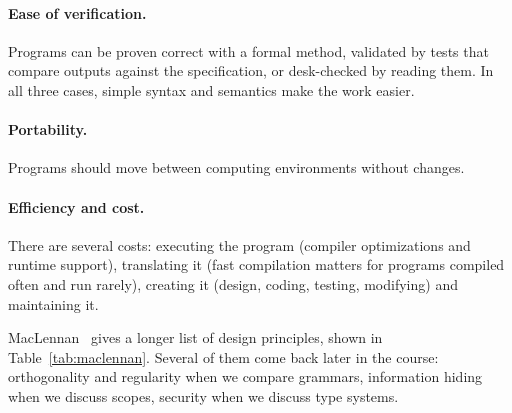 \paragraph{Ease of verification.} Programs can be proven correct with a formal
method, validated by tests that compare outputs against the specification, or
desk-checked by reading them. In all three cases, simple syntax and semantics
make the work easier.

\paragraph{Portability.} Programs should move between computing environments
without changes.

\paragraph{Efficiency and cost.} There are several costs: executing the
program (compiler optimizations and runtime support), translating it (fast
compilation matters for programs compiled often and run rarely), creating it
(design, coding, testing, modifying) and maintaining it.

MacLennan~\cite{maclennan1999principles} gives a longer list of design
principles, shown in Table~\ref{tab:maclennan}. Several of them come back
later in the course: orthogonality and regularity when we compare grammars,
information hiding when we discuss scopes, security when we discuss type
systems.

